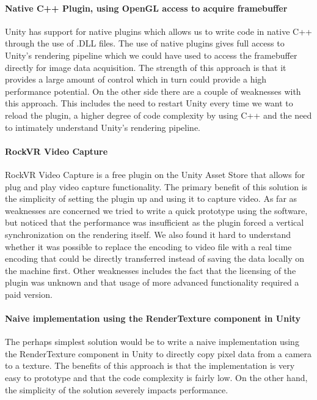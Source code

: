 \paragraph{Native C++ Plugin, using OpenGL access to acquire framebuffer}
Unity has support for native plugins\cite{unity_native_plugin} which allows us to write code in native C++ through the use of .DLL files. The use of native plugins gives full access to Unity's rendering pipeline which we could have used to access the framebuffer directly for image data acquisition. The strength of this approach is that it provides a large amount of control which in turn could provide a high performance potential. On the other side there are a couple of weaknesses with this approach. This includes the need to restart Unity every time we want to reload the plugin, a higher degree of code complexity by using C++ and the need to intimately understand Unity's rendering pipeline.  

\paragraph{RockVR Video Capture}
RockVR Video Capture\cite{unity_asset_store_rockvr} is a free plugin on the Unity Asset Store that allows for plug and play video capture functionality. The primary benefit of this solution is the simplicity of setting the plugin up and using it to capture video. As far as weaknesses are concerned we tried to write a quick prototype using the software, but noticed that the performance was insufficient as the plugin forced a vertical synchronization on the rendering itself. We also found it hard to understand whether it was possible to replace the encoding to video file with a real time encoding that could be directly transferred instead of saving the data locally on the machine first. Other weaknesses includes the fact that the licensing of the plugin was unknown and that usage of more advanced functionality required a paid version. 

\paragraph{Naive implementation using the RenderTexture component in Unity}
The perhaps simplest solution would be to write a naive implementation using the RenderTexture\cite{unity_renderTexture} component in Unity to directly copy pixel data from a camera to a texture. The benefits of this approach is that the implementation is very easy to prototype and that the code complexity is fairly low. On the other hand, the simplicity of the solution severely impacts performance.  

